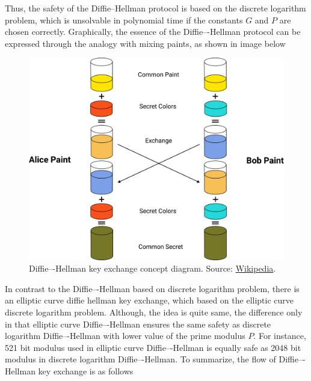 Thus, the safety of the Diffie--Hellman protocol is based on the discrete logarithm problem, which is unsolvable
in polynomial time if the constants $G$ and $P$ are chosen correctly.
Graphically, the essence of the Diffie–-Hellman protocol can be expressed through the analogy with mixing paints,
as shown in image below
\begin{figure}[H]
    \centering
    \includegraphics[width=1\textwidth]{Pictures/07_Diffie-Hellman_keyexchange_concept_diagram}
    \caption{Diffie–-Hellman key exchange concept diagram.
    Source: \href{https://en.wikipedia.org/wiki/Diffie-Hellman_key_exchange}{Wikipedia}.}\label{fig:figure4}
\end{figure}
In contrast to the Diffie–-Hellman based on discrete logarithm problem, there is an elliptic curve diffie hellman
key exchange, which based on the elliptic curve discrete logarithm problem.
Although, the idea is quite same, the difference only in that elliptic curve Diffie–-Hellman ensures the same safety
as discrete logarithm Diffie–-Hellman with lower value of the prime modulus $P$.
For instance, 521 bit modulus used in elliptic curve Diffie–-Hellman is equally safe as 2048 bit modulus in
discrete logarithm Diffie–-Hellman.
To summarize, the flow of Diffie–-Hellman key exchange is as follows
